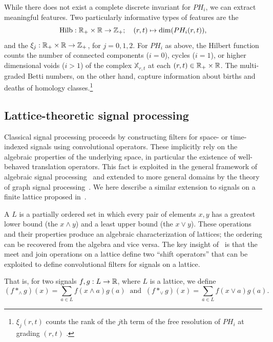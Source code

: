 \documentclass{article}
\begin{document}
While there does not exist a complete discrete invariant for  $PH_i$, we can extract
meaningful features. Two particularly informative types of features are 
 the 
  \[\text{Hilb}: \mathbb{R}_+ \times \mathbb{R} \to \mathbb{Z}_+;\quad (r,t) \mapsto \dim(PH_i(r,t)),\] and
the  $\xi_j: \mathbb{R}_+ \times \mathbb{R} \to \mathbb{Z}_+$, for $j =
0,1,2$. For $PH_i$ as above, the Hilbert function counts the number of
connected components ($i=0$), cycles ($i=1$), or higher dimensional voids ($i >
1$) of the complex $\mathbb{X}_{r,t}$ at each $(r,t) \in \mathbb{R}_+\times \mathbb{R}$. The multi-graded
Betti numbers, on the other hand, capture information about births
and deaths of homology classes.\footnote{ $\xi_j(r,t)$ counts the rank of the $j$th term of the free resolution of $PH_i$ at grading $(r,t)$ \cite{lesnick_interactive_2015}.}

\subsection{Lattice-theoretic signal processing}\label{sec:latticeconv}

Classical signal processing proceeds by constructing filters for space- or time-indexed signals using convolutional operators. These implicitly rely on the
algebraic properties of the underlying space, in particular the existence of
well-behaved translation operators. This fact is exploited in the general
framework of algebraic signal processing~\cite{puschel_algebraic_2008} and
extended to more general domains by the theory of graph signal
processing~\cite{ortega_graph_2018}. We here describe a similar extension to
signals on a finite lattice proposed in~\cite{pueschel_discrete_2019}.

A  $L$ is a partially ordered set in which every pair of
elements $x,y$ has a greatest lower bound (the  $x \wedge y$)
and a least upper bound (the  $x \vee y$). These operations
and their properties produce an algebraic characterization of lattices; the
ordering can be recovered from the algebra and vice versa. The key insight of~\cite{pueschel_discrete_2019} is that the meet and
join operations on a lattice define two ``shift operators'' that can be
exploited to define convolutional filters for signals on a lattice.

That is, for two signals $f,g: L \to \mathbb{R}$, where $L$ is a lattice, we define
\[(f *_\wedge g)(x) = \sum_{a \in L}f(x\wedge a)g(a) \;\;\text{and}\;\; (f *_\vee g)(x) = \sum_{a \in L}f(x\vee a)g(a).\]
\end{document}
